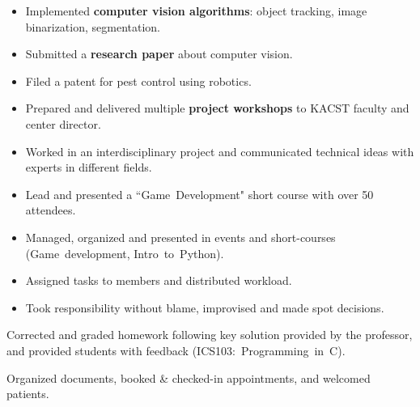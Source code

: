
\begin{itemize}
    \item Implemented \textbf{computer vision algorithms}: object tracking, image binarization, segmentation.
    \item Submitted a \textbf{research paper} about computer vision.
    \item Filed a patent for pest control using robotics.
    \item Prepared and delivered multiple \textbf{project workshops} to KACST faculty and center director.
    \item Worked in an interdisciplinary project and communicated technical ideas with experts in different fields.
\end{itemize}

\divider

\begin{itemize}
    \item Lead and presented a ``Game~Development" short course with over 50 attendees.
    \item Managed, organized and presented in events and short-courses (Game~development, Intro~to~Python).
    \item Assigned tasks to members and distributed workload.
    \item Took responsibility without blame, improvised and made spot decisions.
\end{itemize}

\divider


Corrected and graded homework following key solution provided by the professor, and provided students with feedback (ICS103:~Programming~in~C).

\divider


Organized documents, booked \& checked-in appointments, and welcomed patients.

